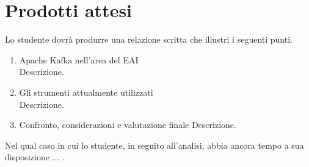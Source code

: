 \section*{Prodotti attesi}
Lo studente dovrà produrre una relazione scritta che illustri i seguenti punti.
\begin{enumerate}
    \item Apache Kafka nell'area del EAI \\
    Descrizione.

    \item Gli strumenti attualmente utilizzati \\
    Descrizione.

    \item Confronto, considerazioni e valutazione finale
    Descrizione.
\end{enumerate}

Nel qual caso in cui lo studente, in seguito all'analisi, abbia ancora tempo a sua disposizione ... .
